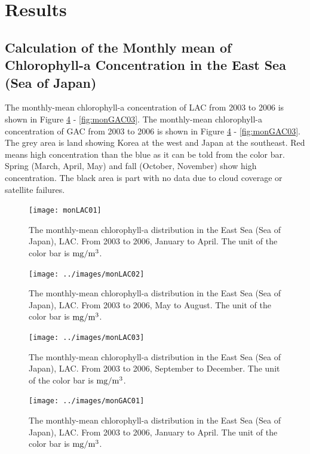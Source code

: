 
\section{Results}

\subsection{Calculation of the Monthly mean of Chlorophyll-a Concentration in the East Sea (Sea of Japan)}
The monthly-mean chlorophyll-a concentration of LAC from 2003 to 2006 is shown in Figure \ref{fig:monGAC01} - \ref{fig:monGAC03}. The monthly-mean chlorophyll-a concentration of GAC from 2003 to 2006 is shown in Figure \ref{fig:monGAC01} - \ref{fig:monGAC03}. The grey area is land showing Korea at the west and Japan at the southeast. Red means high concentration than the blue as it can be told from the color bar. Spring (March, April, May) and fall (October, November) show high concentration. The black area is part with no data due to cloud coverage or satellite failures. 

\begin{figure}[p]
	\centering
	\texttt{[image: monLAC01]}\\
	\caption{The monthly-mean chlorophyll-a distribution in the East Sea (Sea of Japan), LAC. From 2003 to 2006, January to April. The unit of the color bar is $\rm mg/m^3$.}
	\label{fig:monLAC01}
\end{figure}


\begin{figure}[p]
	\centering
	\texttt{[image: ../images/monLAC02]}\\
	\caption{The monthly-mean chlorophyll-a distribution in the East Sea (Sea of Japan), LAC. From 2003 to 2006, May to August. The unit of the color bar is $\rm mg/m^3$.}
	\label{fig:monLAC02}
\end{figure}

\begin{figure}[p]
	\centering
	\texttt{[image: ../images/monLAC03]}\\
	\caption{The monthly-mean chlorophyll-a distribution in the East Sea (Sea of Japan), LAC. From 2003 to 2006, September to December. The unit of the color bar is $\rm mg/m^3$.}
	\label{fig:monLAC03}
\end{figure}


\begin{figure}[p]
	\centering
	\texttt{[image: ../images/monGAC01]}\\
	\caption{The monthly-mean chlorophyll-a distribution in the East Sea (Sea of Japan), LAC. From 2003 to 2006, January to April. The unit of the color bar is $\rm mg/m^3$.}
	\label{fig:monGAC01}
\end{figure}


